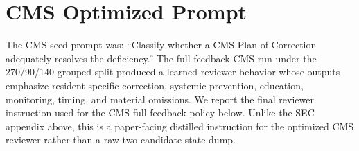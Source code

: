\documentclass[11pt]{article}
\begin{document}
\section{CMS Optimized Prompt}
\label{app:cms_prompt}

The CMS seed prompt was: ``Classify whether a CMS Plan of Correction adequately resolves the deficiency.'' The full-feedback CMS run under the 270/90/140 grouped split produced a learned reviewer behavior whose outputs emphasize resident-specific correction, systemic prevention, education, monitoring, timing, and material omissions. We report the final reviewer instruction used for the CMS full-feedback policy below. Unlike the SEC appendix above, this is a paper-facing distilled instruction for the optimized CMS reviewer rather than a raw two-candidate state dump.
\end{document}
